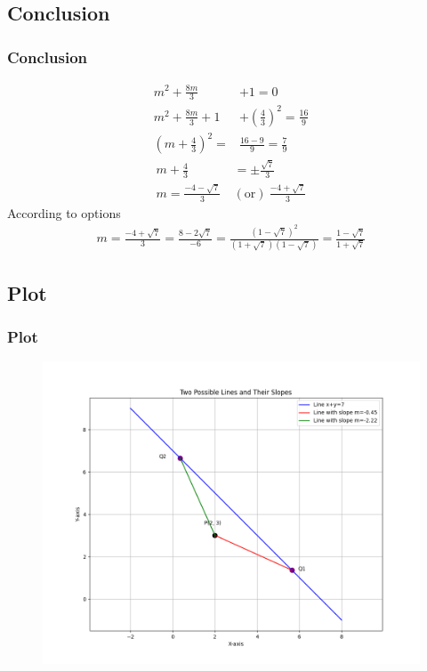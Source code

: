 \documentclass{beamer}
\providecommand{\brak}[1]{\ensuremath{\left(#1\right)}}
\theoremstyle{remark}
\numberwithin{equation}{section}
\begin{document}
\subsection{Conclusion}
\begin{frame}
\frametitle{Conclusion}
\begin{align}
m^2 +\frac{8m}{3}& + 1 = 0 \\
m^2 +\frac{8m}{3} + 1 &+\brak{\frac{4}{3}}^2= \frac{16}{9} \\
\brak{m+\frac{4}{3}}^2=&\frac{16-9}{9}=\frac{7}{9} 
\end{align}
\begin{align}  
m+\frac{4}{3}&=\pm\frac{\sqrt{7}}{3} \\
m=\frac{-4-\sqrt{7}}{3}\ &\brak{\text{or}}\ \frac{-4+\sqrt{7}}{3}
\end{align}
According to options
\begin{align}
m=\frac{-4+\sqrt{7}}{3}=\frac{8-2\sqrt{7}}{-6}=\frac{\brak{1-\sqrt{7}}^2}{\brak{1+\sqrt{7}}\brak{1-\sqrt{7}}}=\frac{1-\sqrt{7}}{1+\sqrt{7}}
\end{align}
\end{frame}
\subsection{Plot}
\begin{frame}[fragile]
\frametitle{Plot}

\begin{figure}[h!]
   \centering
   \includegraphics[width=0.7\columnwidth]{figs/fig1.png}
	\caption{}
   \label{}
\end{figure}
\end{frame}
\end{document}
